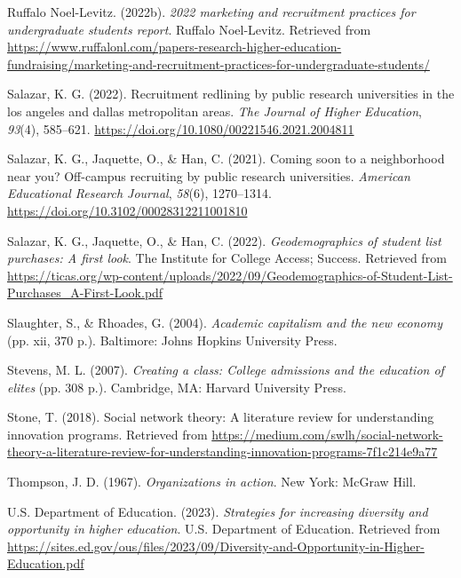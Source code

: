 \documentclass[
  12pt,
]{article}
\newlength{\cslhangindent}
\newenvironment{CSLReferences}[2] %
 {\begin{list}{}{%
  \setlength{\itemindent}{0pt}
  \setlength{\leftmargin}{0pt}
  \setlength{\parsep}{0pt}
  \ifodd #1
   \setlength{\leftmargin}{\cslhangindent}
   \setlength{\itemindent}{-1\cslhangindent}
  \fi
  \setlength{\itemsep}{#2\baselineskip}}}
 {\end{list}}
\begin{document}
\begin{CSLReferences}{1}{0}
Ruffalo Noel-Levitz. (2022b). \emph{2022 marketing and recruitment practices for undergraduate students report}. Ruffalo Noel-Levitz. Retrieved from \url{https://www.ruffalonl.com/papers-research-higher-education-fundraising/marketing-and-recruitment-practices-for-undergraduate-students/}

Salazar, K. G. (2022). Recruitment redlining by public research universities in the los angeles and dallas metropolitan areas. \emph{The Journal of Higher Education}, \emph{93}(4), 585--621. \url{https://doi.org/10.1080/00221546.2021.2004811}

Salazar, K. G., Jaquette, O., \& Han, C. (2021). Coming soon to a neighborhood near you? Off-campus recruiting by public research universities. \emph{American Educational Research Journal}, \emph{58}(6), 1270--1314. \url{https://doi.org/10.3102/00028312211001810}

Salazar, K. G., Jaquette, O., \& Han, C. (2022). \emph{Geodemographics of student list purchases: A first look}. The Institute for College Access; Success. Retrieved from \url{https://ticas.org/wp-content/uploads/2022/09/Geodemographics-of-Student-List-Purchases_A-First-Look.pdf}

Slaughter, S., \& Rhoades, G. (2004). \emph{Academic capitalism and the new economy} (pp. xii, 370 p.). Baltimore: Johns Hopkins University Press.

Stevens, M. L. (2007). \emph{Creating a class: College admissions and the education of elites} (pp. 308 p.). Cambridge, MA: Harvard University Press.

Stone, T. (2018). Social network theory: A literature review for understanding innovation programs. Retrieved from \url{https://medium.com/swlh/social-network-theory-a-literature-review-for-understanding-innovation-programs-7f1c214e9a77}

Thompson, J. D. (1967). \emph{Organizations in action}. New York: McGraw Hill.

U.S. Department of Education. (2023). \emph{Strategies for increasing diversity and opportunity in higher education}. U.S. Department of Education. Retrieved from \url{https://sites.ed.gov/ous/files/2023/09/Diversity-and-Opportunity-in-Higher-Education.pdf}


\end{CSLReferences}
\end{document}
